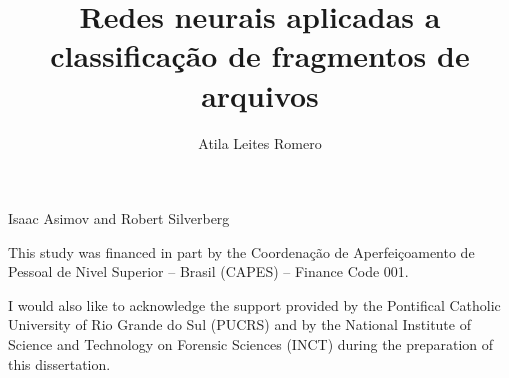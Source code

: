 \documentclass[english,oneside]{pucrs-ppgcc}
\author{Atila Leites Romero}
\title{Redes neurais aplicadas a classificação de fragmentos de arquivos}
      {Applied neural networks for file fragment classification}
\begin{document}

%
         {Isaac Asimov and Robert Silverberg  \cite{asimov_nightfall_2011}}


\begin{agradecimentos}
This study was financed in part by the Coordenação de Aperfeiçoamento de Pessoal de Nivel Superior – Brasil (CAPES) – Finance Code 001.

I would also like to acknowledge the support provided by the Pontifical Catholic University of Rio Grande do Sul (PUCRS) and by the National Institute of Science and Technology on Forensic Sciences (INCT) during the preparation of this dissertation.

\end{agradecimentos}




\setcounter{tocdepth}{1}

\listoffigures       %
\listoftables        %
\listofacronyms      %
\tableofcontents     %
\end{document}
